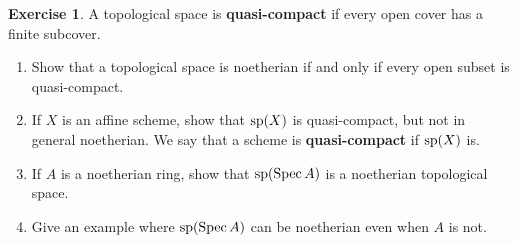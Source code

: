 \documentclass[]{pcmi}
\theoremstyle{plain}
\theoremstyle{definition}
\newtheorem{Exercise}[subsubsection]{Exercise}
\theoremstyle{remark}
\begin{document}
\begin{Exercise}
    A topological space is \textbf{quasi-compact} if every open cover has a finite subcover. 
    \begin{enumerate}[label = (\alph*)]
        \item Show that a topological space is noetherian if and only if every open subset is quasi-compact. 
        \item If $X$ is an affine scheme, show that $\operatorname{sp} (X)$ is quasi-compact, but not in general noetherian. We say that a scheme is \textbf{quasi-compact} if $\operatorname{sp}(X)$ is. 
        \item If $A$ is a noetherian ring, show that $\operatorname{sp} (\operatorname{Spec} A)$ is a noetherian topological space. 
        \item Give an example where $\operatorname{sp} (\operatorname{Spec} A)$ can be noetherian even when $A$ is not. 
    \end{enumerate}
\end{Exercise}
\end{document}
